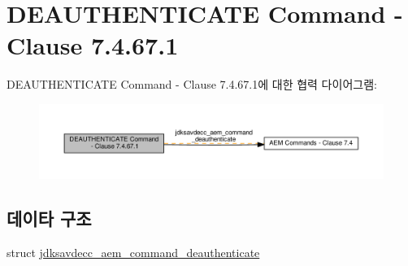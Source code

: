 \hypertarget{group__command__deauthenticate}{}\section{D\+E\+A\+U\+T\+H\+E\+N\+T\+I\+C\+A\+TE Command -\/ Clause 7.4.67.1}
\label{group__command__deauthenticate}
D\+E\+A\+U\+T\+H\+E\+N\+T\+I\+C\+A\+TE Command -\/ Clause 7.4.67.1에 대한 협력 다이어그램\+:
\nopagebreak
\begin{figure}[H]
\begin{center}
\leavevmode
\includegraphics[width=350pt]{group__command__deauthenticate}
\end{center}
\end{figure}
\subsection*{데이타 구조}
\begin{DoxyCompactItemize}
\item 
struct \hyperlink{structjdksavdecc__aem__command__deauthenticate}{jdksavdecc\+\_\+aem\+\_\+command\+\_\+deauthenticate}
\end{DoxyCompactItemize}
